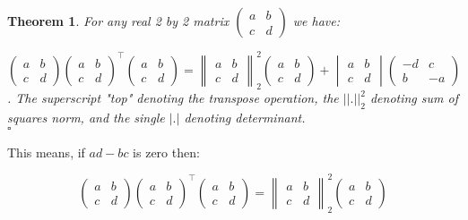 \documentclass{article}
\newtheorem{theorem}{Theorem}
\begin{document}
\begin{theorem}
For any real 2 by 2 matrix
$\begin{pmatrix} a & b \\ c & d \end{pmatrix}$ we have:


\[
\begin{pmatrix} a & b \\ c & d \end{pmatrix}
\begin{pmatrix} a & b \\ c & d \end{pmatrix}^{\top}
\begin{pmatrix} a & b \\ c & d \end{pmatrix}
=
\begin{Vmatrix} a & b \\ c & d \end{Vmatrix}_2^2
\begin{pmatrix} a & b \\ c & d \end{pmatrix} 
+
\begin{vmatrix} a & b \\ c & d \end{vmatrix}
\begin{pmatrix} -d & c \\ b & -a \end{pmatrix} 
\].
The superscript "top" denoting the transpose operation, the $||.||^2_2$ denoting sum of squares norm, and the single $|.|$ denoting determinant.
\\ $\square$
\label{thm:fmla}
\end{theorem}


This means, if $a d - b c$ is zero then:


\[ 
\begin{pmatrix} a & b \\ c & d \end{pmatrix}
\begin{pmatrix} a & b \\ c & d \end{pmatrix}^{\top}
\begin{pmatrix} a & b \\ c & d \end{pmatrix}
=
\begin{Vmatrix} a & b \\ c & d \end{Vmatrix}_2^2
\begin{pmatrix} a & b \\ c & d \end{pmatrix}
\]
\end{document}
